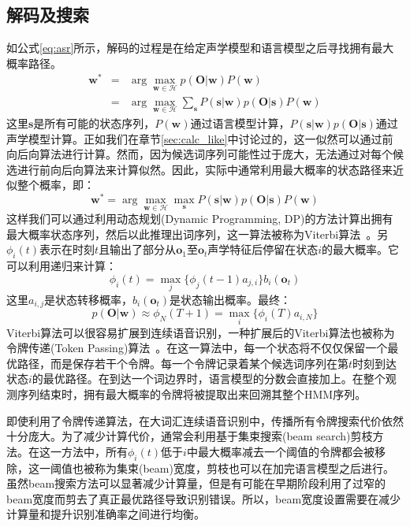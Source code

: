 \subsection{解码及搜索}
\label{sec:decode}
如公式\ref{eq:asr}所示，解码的过程是在给定声学模型和语言模型之后寻找拥有最大概率路径。
\begin{eqnarray}
\mathbf{w}^* &=& \arg \max_{\mathbf{w} \in \mathcal{H}}p(\mathbf{O}|\mathbf{w})P(\mathbf{w}) \\
&=& \arg \max_{\mathbf{w} \in \mathcal{H}} \sum_{\mathbf{s}} P(\mathbf{s}|\mathbf{w})p(\mathbf{O}|\mathbf{s})P(\mathbf{w})
\end{eqnarray}
这里$\mathbf{s}$是所有可能的状态序列，$P(\mathbf{w})$通过语言模型计算，$P(\mathbf{s}|\mathbf{w})p(\mathbf{O}|\mathbf{s})$通过声学模型计算。正如我们在章节\ref{sec:calc_like}中讨论过的，这一似然可以通过前向后向算法进行计算。然而，因为候选词序列可能性过于庞大，无法通过对每个候选进行前向后向算法来计算似然。因此，实际中通常利用最大概率的状态路径来近似整个概率，即：
\begin{equation}
\label{eq:decode}
\mathbf{w}^* = \arg \max_{\mathbf{w} \in \mathcal{H}} \max_{\mathbf{s}} P(\mathbf{s}|\mathbf{w})p(\mathbf{O}|\mathbf{s})P(\mathbf{w})
\end{equation}
这样我们可以通过利用动态规划(Dynamic Programming, DP)的方法计算出拥有最大概率状态序列，然后以此推理出词序列，这一算法被称为Viterbi算法~\cite{viterbi1967error}。另$\phi_i(t)$表示在时刻$t$且输出了部分从$\mathbf{o}_1$至$\mathbf{o}_t$声学特征后停留在状态$i$的最大概率。它可以利用递归来计算：
\begin{equation}
    \phi_i(t)=\max_j\{\phi_j(t-1)a_{j,i}\}b_i(\mathbf{o}_t)
\end{equation}
这里$a_{i,j}$是状态转移概率，$b_i(\mathbf{o}_t)$是状态输出概率。最终：
\begin{equation}
    p(\mathbf{O}|\mathbf{w}) \approx \phi_{N}(T+1) = \max_i\{\phi_i(T)a_{i,N}\}
\end{equation}
Viterbi算法可以很容易扩展到连续语音识别，一种扩展后的Viterbi算法也被称为令牌传递(Token Passing)算法~\cite{young2002htk}。在这一算法中，每一个状态将不仅仅保留一个最优路径，而是保存若干个令牌。每一个令牌记录着某个候选词序列在第$t$时刻到达状态$i$的最优路径。在到达一个词边界时，语言模型的分数会直接加上。在整个观测序列结束时，拥有最大概率的令牌将被提取出来回溯其整个HMM序列。

即使利用了令牌传递算法，在大词汇连续语音识别中，传播所有令牌搜索代价依然十分庞大。为了减少计算代价，通常会利用基于集束搜索(beam search)剪枝方法。在这一方法中，所有$\phi_i(t)$低于$i$中最大概率减去一个阈值的令牌都会被移除，这一阈值也被称为集束(beam)宽度，剪枝也可以在加完语言模型之后进行。虽然beam搜索方法可以显著减少计算量，但是有可能在早期阶段利用了过窄的beam宽度而剪去了真正最优路径导致识别错误。所以，beam宽度设置需要在减少计算量和提升识别准确率之间进行均衡。

